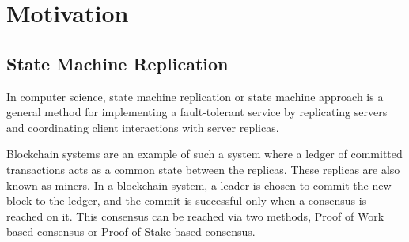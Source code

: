 
\chapter{Motivation} %

\label{Chapter 2} %


\section{State Machine Replication}

In computer science, state machine replication or state machine approach is a general method for implementing a fault-tolerant service by replicating servers and coordinating client interactions with server replicas.


Blockchain systems are an example of such a system where a ledger of committed transactions acts as a common state between the replicas. These replicas are also known as miners. In a blockchain system, a leader is chosen to commit the new block to the ledger, and the commit is successful only when a consensus is reached on it. This consensus can be reached via two methods, Proof of Work based consensus or Proof of Stake based consensus.




